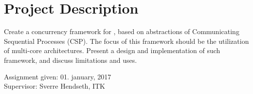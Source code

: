 \newpage
{}
\section*{Project Description}
\label{sec:project_description}

Create a concurrency framework for \Cpp{}, based on abstractions of Communicating Sequential Processes (CSP). The focus of this framework should be the utilization of multi\hyp{}core architectures. Present a design and implementation of such framework, and discuss limitations and uses.

\begin{flushleft}
Assignment given: 01. january, 2017\\
Supervisor: Sverre Hendseth, ITK
\end{flushleft}


\afterpage{\blankpage}
